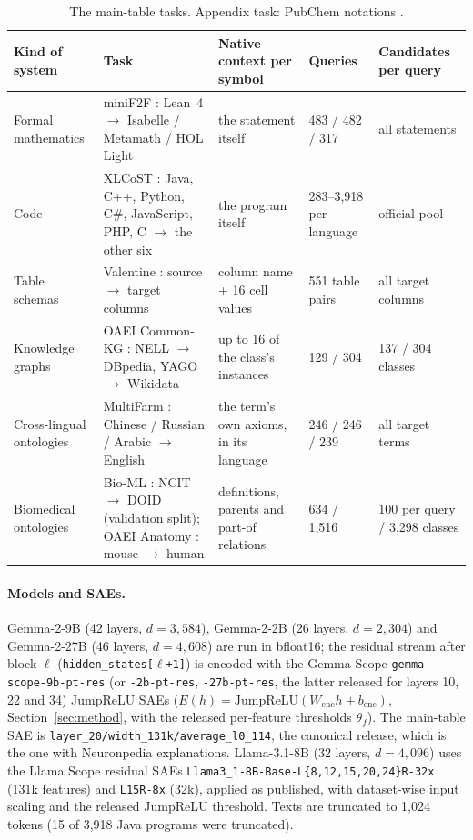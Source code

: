 \documentclass[11pt]{article}
\begin{document}
\begin{table}[H]
  \centering\small
  \begin{tabular}{@{}p{}p{}p{}p{}p{}@{}}
    \toprule
    Kind of system & Task & Native context per symbol & Queries & Candidates per query \\
    \midrule
    Formal mathematics & miniF2F \citep{zheng2022minif2f}: Lean~4 $\to$ Isabelle / Metamath / HOL Light & the statement itself & 483 / 482 / 317 & all statements \\
    Code & XLCoST \citep{zhu2022xlcost}: Java, C++, Python, C\#, JavaScript, PHP, C $\to$ the other six & the program itself & 283--3,918 per language & official pool \\
    Table schemas & Valentine \citep{koutras2021valentine}: source $\to$ target columns & column name + 16 cell values & 551 table pairs & all target columns \\
    Knowledge graphs & OAEI Common-KG \citep{fallatah2020gold}: NELL $\to$ DBpedia, YAGO $\to$ Wikidata & up to 16 of the class's instances & 129 / 304 & 137 / 304 classes \\
    Cross-lingual ontologies & MultiFarm \citep{meilicke2012multifarm}: Chinese / Russian / Arabic $\to$ English & the term's own axioms, in its language & 246 / 246 / 239 & all target terms \\
    Biomedical ontologies & Bio-ML \citep{he2022bioml}: NCIT $\to$ DOID (validation split); OAEI Anatomy \citep{bodenreider2005mice}: mouse $\to$ human & definitions, parents and part-of relations & 634 / 1,516 & 100 per query / 3,298 classes \\
    \bottomrule
  \end{tabular}
  \caption{The main-table tasks. Appendix task: PubChem notations \citep{kim2023pubchem}.}
  \label{tab:benchmarks}
\end{table}

\paragraph{Models and SAEs.}
Gemma-2-9B (42 layers, $d=3{,}584$), Gemma-2-2B (26 layers, $d=2{,}304$) and Gemma-2-27B (46 layers, $d=4{,}608$) are run in bfloat16; the residual stream after block $\ell$ (\texttt{hidden\_states[$\ell$+1]}) is encoded with the Gemma Scope \texttt{gemma-scope-9b-pt-res} (or \texttt{-2b-pt-res}, \texttt{-27b-pt-res}, the latter released for layers 10, 22 and 34) JumpReLU SAEs ($E(h)=\mathrm{JumpReLU}(W_{\mathrm{enc}}h+b_{\mathrm{enc}})$, Section~\ref{sec:method}, with the released per-feature thresholds $\theta_f$).
The main-table SAE is \texttt{layer\_20/width\_131k/average\_l0\_114}, the canonical release, which is the one with Neuronpedia explanations.
Llama-3.1-8B (32 layers, $d=4{,}096$) uses the Llama Scope residual SAEs \texttt{Llama3\_1-8B-Base-L\{8,12,15,20,24\}R-32x} (131k features) and \texttt{L15R-8x} (32k), applied as published, with dataset-wise input scaling and the released JumpReLU threshold.
Texts are truncated to 1,024 tokens (15 of 3,918 Java programs were truncated).
\end{document}

